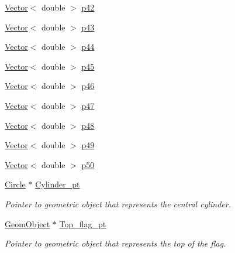 \begin{DoxyCompactItemize}
\item 
\hyperlink{classoomph_1_1Vector}{Vector}$<$ double $>$ \hyperlink{classoomph_1_1CylinderWithFlagDomain_a49f3169b5cd06322394e808f3fb8dc91}{p42}
\item 
\hyperlink{classoomph_1_1Vector}{Vector}$<$ double $>$ \hyperlink{classoomph_1_1CylinderWithFlagDomain_a4cf79435459ac5399f94f6e0686e5a0a}{p43}
\item 
\hyperlink{classoomph_1_1Vector}{Vector}$<$ double $>$ \hyperlink{classoomph_1_1CylinderWithFlagDomain_a4288652a4436b747a86ff94346c61ebc}{p44}
\item 
\hyperlink{classoomph_1_1Vector}{Vector}$<$ double $>$ \hyperlink{classoomph_1_1CylinderWithFlagDomain_a6988e0912e925fe62d6cad22195e8c5d}{p45}
\item 
\hyperlink{classoomph_1_1Vector}{Vector}$<$ double $>$ \hyperlink{classoomph_1_1CylinderWithFlagDomain_a5dedb150b33c1260e09a5e73924c6861}{p46}
\item 
\hyperlink{classoomph_1_1Vector}{Vector}$<$ double $>$ \hyperlink{classoomph_1_1CylinderWithFlagDomain_a34928d206b87289667344fc94a307509}{p47}
\item 
\hyperlink{classoomph_1_1Vector}{Vector}$<$ double $>$ \hyperlink{classoomph_1_1CylinderWithFlagDomain_ae02eac305b33b85a2e87df1764e4b8d8}{p48}
\item 
\hyperlink{classoomph_1_1Vector}{Vector}$<$ double $>$ \hyperlink{classoomph_1_1CylinderWithFlagDomain_aa5418e036166408fb5df662d93479a84}{p49}
\item 
\hyperlink{classoomph_1_1Vector}{Vector}$<$ double $>$ \hyperlink{classoomph_1_1CylinderWithFlagDomain_a0b46b0c29925ba405a04fda8b3ab9c06}{p50}
\item 
\hyperlink{classoomph_1_1Circle}{Circle} $\ast$ \hyperlink{classoomph_1_1CylinderWithFlagDomain_afb13bdcd16005bc0505908bb3c844f33}{Cylinder\+\_\+pt}
\begin{DoxyCompactList}\small\item\em Pointer to geometric object that represents the central cylinder. \end{DoxyCompactList}\item 
\hyperlink{classoomph_1_1GeomObject}{Geom\+Object} $\ast$ \hyperlink{classoomph_1_1CylinderWithFlagDomain_a92ae4556f99335233c1c653e15fa1f48}{Top\+\_\+flag\+\_\+pt}
\begin{DoxyCompactList}\small\item\em Pointer to geometric object that represents the top of the flag. \end{DoxyCompactList}\item 

\end{DoxyCompactItemize}
